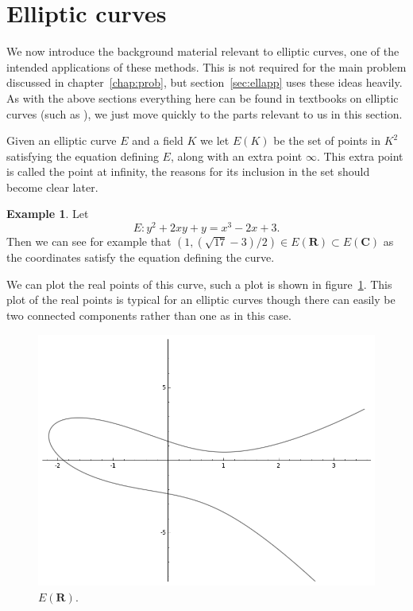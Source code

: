 \documentclass[a4paper,abstracton,bibtotoc]{scrreprt}
\theoremstyle{definition}
\newtheorem{ex}{Example}
\newcommand{\RR}{\mathbf{R}}
\newcommand{\CC}{\mathbf{C}}
\begin{document}
%


\section{Elliptic curves}
\label{sec:ell}

We now introduce the background material relevant to elliptic curves, one of the intended applications of these methods.
This is not required for the main problem discussed in chapter~\ref{chap:prob}, but section~\ref{sec:ellapp} uses these ideas heavily.
As with the above sections everything here can be found in textbooks on elliptic curves (such as \cite{knapp}), we just move quickly to the parts relevant to us in this section.

Given an elliptic curve $E$ and a field $K$ we let $E(K)$ be the set of points in $K^2$ satisfying the equation defining $E$, along with an extra point $\infty$.
This extra point is called the point at infinity, the reasons for its inclusion in the set should become clear later.

\begin{ex}
Let 
\[
E \colon y^2 + 2xy + y = x^3 - 2x + 3.
\]
Then we can see for example that $(1,(\sqrt{17}-3)/2)\in E(\RR) \subset E(\CC)$ as the coordinates satisfy the equation defining the curve.

We can plot the real points of this curve, such a plot is shown in figure~\ref{fig:ec}.
This plot of the real points is typical for an elliptic curves though there can easily be two connected components rather than one as in this case.
\begin{figure}
\centering
\includegraphics[scale=0.6]{sageec}
\caption{\label{fig:ec}$E(\RR)$.}
\end{figure}
\end{ex}
\end{document}
